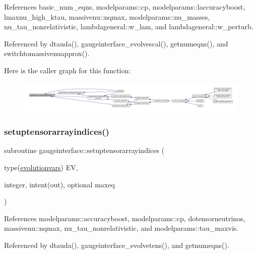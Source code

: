 References basic\+\_\+num\+\_\+eqns, modelparams\+::cp, modelparams\+::laccuracyboost, lmaxnu\+\_\+high\+\_\+ktau, massivenu\+::nqmax, modelparams\+::nu\+\_\+masses, nu\+\_\+tau\+\_\+nonrelativistic, lambdageneral\+::w\+\_\+lam, and lambdageneral\+::w\+\_\+perturb.



Referenced by dtauda(), gaugeinterface\+\_\+evolvescal(), getnumeqns(), and switchtomassivenuapprox().

Here is the caller graph for this function\+:
\nopagebreak
\begin{figure}[H]
\begin{center}
\leavevmode
\includegraphics[width=350pt]{namespacegaugeinterface_a50a72debb65475527ccc7e76af616083_icgraph}
\end{center}
\end{figure}
\mbox{\label{namespacegaugeinterface_a21f6d1e93445d43fc8247f57dce52716}} 
\subsubsection{\texorpdfstring{setuptensorarrayindices()}{setuptensorarrayindices()}}
{\footnotesize\ttfamily subroutine gaugeinterface\+::setuptensorarrayindices (\begin{DoxyParamCaption}\item[{type(\mbox{\hyperlink{structgaugeinterface_1_1evolutionvars}{evolutionvars}})}]{EV,  }\item[{integer, intent(out), optional}]{maxeq }\end{DoxyParamCaption})}



References modelparams\+::accuracyboost, modelparams\+::cp, dotensorneutrinos, massivenu\+::nqmax, nu\+\_\+tau\+\_\+nonrelativistic, and modelparams\+::tau\+\_\+maxvis.



Referenced by dtauda(), gaugeinterface\+\_\+evolvetens(), and getnumeqns().

